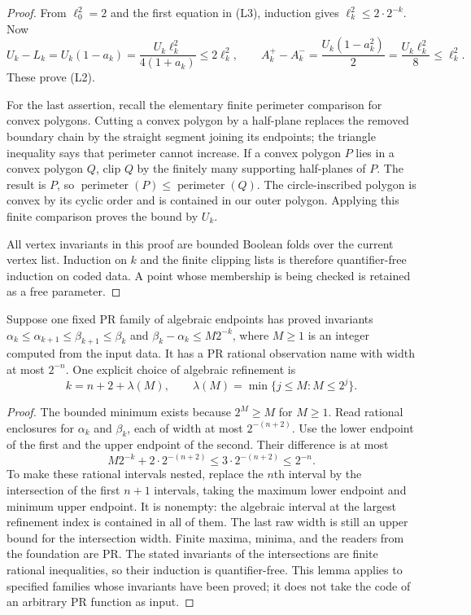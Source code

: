 \begin{proof}
From $\ell_0^2=2$ and the first equation in (L3), induction gives
$\ell_k^2\le2\cdot2^{-k}$. Now
\[
 U_k-L_k=U_k(1-a_k)
   =\frac{U_k\ell_k^2}{4(1+a_k)}\le2\ell_k^2,
 \qquad
 A_k^+-A_k^-=\frac{U_k(1-a_k^2)}2
            =\frac{U_k\ell_k^2}{8}\le\ell_k^2.
\]
These prove (L2).

For the last assertion, recall the elementary finite perimeter comparison
for convex polygons. Cutting a convex polygon by a half-plane replaces
the removed boundary chain by the straight segment joining its endpoints;
the triangle inequality says that perimeter cannot increase.
If a convex polygon $P$ lies in a convex polygon $Q$, clip $Q$ by the
finitely many supporting half-planes of $P$. The result is $P$, so
$\operatorname{perimeter}(P)\le\operatorname{perimeter}(Q)$.
The circle-inscribed polygon is convex by its cyclic order and is
contained in our outer polygon. Applying this finite comparison proves
the bound by $U_k$.

All vertex invariants in this proof are bounded Boolean folds over the
current vertex list. Induction on $k$ and the finite clipping lists is
therefore quantifier-free induction on coded data. A point whose
membership is being checked is retained as a free parameter.
\end{proof}

\begin{lemma}
\label{lim:rationalize}
Suppose one fixed PR family of algebraic endpoints has proved invariants
$\alpha_k\le\alpha_{k+1}\le\beta_{k+1}\le\beta_k$ and
$\beta_k-\alpha_k\le M2^{-k}$, where $M\ge1$ is an integer computed
from the input data. It has a PR rational observation name with width
at most $2^{-n}$. One explicit choice of algebraic refinement is
\[
 k=n+2+\lambda(M),\qquad
 \lambda(M)=\min\{j\le M:M\le2^j\}.                 \tag{L4}
\]
\end{lemma}
\begin{proof}
The bounded minimum exists because $2^M\ge M$ for $M\ge1$.
Read rational enclosures for $\alpha_k$ and $\beta_k$, each of width
at most $2^{-(n+2)}$. Use the lower endpoint of the first and the upper
endpoint of the second. Their difference is at most
\[
 M2^{-k}+2\cdot2^{-(n+2)}
       \le3\cdot2^{-(n+2)}\le2^{-n}.
\]
To make these rational intervals nested, replace the $n$th interval by
the intersection of the first $n+1$ intervals, taking the maximum lower
endpoint and minimum upper endpoint. It is nonempty: the algebraic
interval at the largest refinement index is contained in all of them.
The last raw width is still an upper bound for the intersection width.
Finite maxima, minima, and the readers from the foundation are PR.
The stated invariants of the intersections are finite rational
inequalities, so their induction is quantifier-free.
This lemma applies to specified families whose invariants have been
proved; it does not take the code of an arbitrary PR function as input.
\end{proof}

